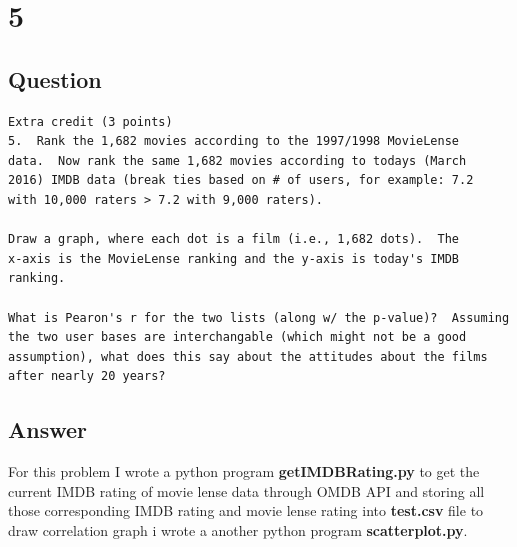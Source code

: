 \documentclass[letterpaper,11pt]{article}
\begin{document}
\clearpage


\section*{5}

\subsection*{Question}

\begin{verbatim}
Extra credit (3 points)
5.  Rank the 1,682 movies according to the 1997/1998 MovieLense
data.  Now rank the same 1,682 movies according to todays (March
2016) IMDB data (break ties based on # of users, for example: 7.2
with 10,000 raters > 7.2 with 9,000 raters).

Draw a graph, where each dot is a film (i.e., 1,682 dots).  The
x-axis is the MovieLense ranking and the y-axis is today's IMDB
ranking.

What is Pearon's r for the two lists (along w/ the p-value)?  Assuming
the two user bases are interchangable (which might not be a good
assumption), what does this say about the attitudes about the films
after nearly 20 years?
\end{verbatim}

\subsection*{Answer}
For this problem I wrote a python program \textbf{getIMDBRating.py} to get the current  IMDB rating of movie lense data through OMDB API and storing all those corresponding IMDB rating and movie lense rating into \textbf{test.csv} file to draw correlation graph i wrote a another python program \textbf{scatterplot.py}.




\end{document}
